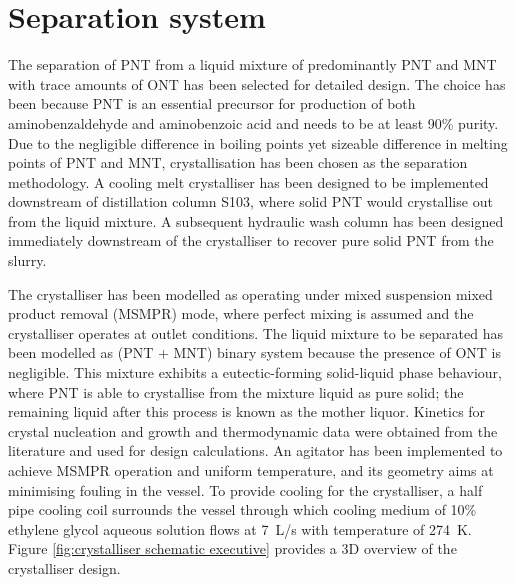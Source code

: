 \section*{Separation system}

The separation of PNT from a liquid mixture of predominantly PNT and MNT with trace amounts of ONT has been selected for detailed design. The choice has been because PNT is an essential precursor for production of both aminobenzaldehyde and aminobenzoic acid and needs to be at least 90\% purity. Due to the negligible difference in boiling points yet sizeable difference in melting points of PNT and MNT, crystallisation has been chosen as the separation methodology. A cooling melt crystalliser has been designed to be implemented downstream of distillation column S103, where solid PNT would crystallise out from the liquid mixture. A subsequent hydraulic wash column has been designed immediately downstream of the crystalliser to recover pure solid PNT from the slurry. 


The crystalliser has been modelled as operating under mixed suspension mixed product removal (MSMPR) mode, where perfect mixing is assumed and the crystalliser operates at outlet conditions. The liquid mixture to be separated has been modelled as (PNT + MNT) binary system because the presence of ONT is negligible. This mixture exhibits a eutectic-forming solid-liquid phase behaviour, where PNT is able to crystallise from the mixture liquid as pure solid; the remaining liquid after this process is known as the mother liquor. Kinetics for crystal nucleation and growth and thermodynamic data were obtained from the literature and used for design calculations. An agitator has been implemented to achieve MSMPR operation and uniform temperature, and its geometry aims at minimising fouling in the vessel. To provide cooling for the crystalliser, a half pipe cooling coil surrounds the vessel through which cooling medium of 10\% ethylene glycol aqueous solution flows at \SI{7}{L/s} with temperature of \SI{274}{K}. Figure \ref{fig:crystalliser schematic executive} provides a 3D overview of the crystalliser design.


